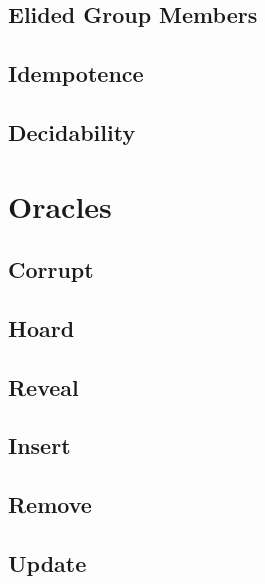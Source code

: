 \hypertarget{elided-group-members}{%
\subsection{Elided Group Members}\label{elided-group-members}}

\hypertarget{idempotence}{%
\subsection{Idempotence}\label{idempotence}}

\hypertarget{decidability}{%
\subsection{Decidability}\label{decidability}}

\hypertarget{sec:game-oracles}{%
\section{Oracles}\label{sec:game-oracles}}

\hypertarget{corrupt}{%
\subsection{Corrupt}\label{corrupt}}

\hypertarget{hoard}{%
\subsection{Hoard}\label{hoard}}

\hypertarget{reveal}{%
\subsection{Reveal}\label{reveal}}

\hypertarget{insert}{%
\subsection{Insert}\label{insert}}

\hypertarget{remove}{%
\subsection{Remove}\label{remove}}

\hypertarget{update}{%
\subsection{Update}\label{update}}

